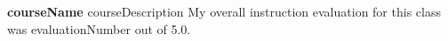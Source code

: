 \item \textbf{{courseName}} {{courseDescription}} My overall instruction evaluation 
for this class was {{evaluationNumber}} out of 5.0.
